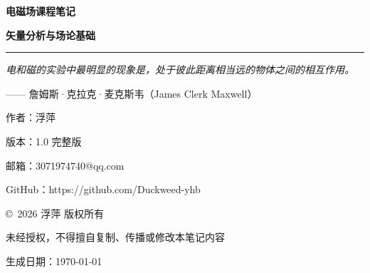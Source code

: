 \begin{titlepage}
    \centering
    \vspace*{2.5cm}
    
    {\Huge \bfseries 电磁场课程笔记 \par}
    \vspace{1cm}
    
    {\Large \bfseries 矢量分析与场论基础 \par}
    \vspace{0.8cm}
    
    \rule{\linewidth}{0.2mm}
    \vspace{1.5cm}
    
    {\itshape \large 电和磁的实验中最明显的现象是，处于彼此距离相当远的物体之间的相互作用。 \par}
    \vspace{0.5cm}
    {\large —— 詹姆斯·克拉克·麦克斯韦（James Clerk Maxwell） \par}
    \vspace{2cm}
    
    {\Large 作\quad 者：浮萍 \par}
    \vspace{0.4cm}
    {\Large 版\quad 本：1.0 完整版 \par}
    \vspace{0.4cm}
    {\Large 邮\quad 箱：3071974740@qq.com \par}
    \vspace{0.4cm}
    {\Large GitHub：https://github.com/Duckweed-yhb \par}
    \vspace{1.5cm}
    
    {\large \copyright\ 2026 浮萍 版权所有 \par}
    {\large 未经授权，不得擅自复制、传播或修改本笔记内容 \par}
    \vspace{0.8cm}
    
    {\large 生成日期：\today \par}
\end{titlepage}